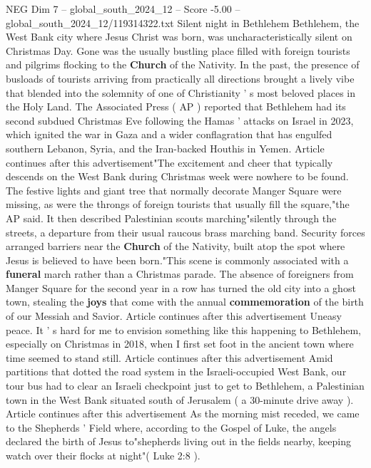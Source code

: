 \begin{textsample}{NEG Dim 7 – global\_south\_2024\_12 – Score -5.00 – global\_south\_2024\_12/119314322.txt}  \label{ex:f7_neg_296}
Silent night in Bethlehem Bethlehem, the West Bank city where Jesus Christ was born, was uncharacteristically silent on Christmas Day.
Gone was the usually bustling place filled with foreign tourists and pilgrims flocking to the \textbf{Church} of the Nativity.
In the past, the presence of busloads of tourists arriving from practically all directions brought a lively vibe that blended into the solemnity of one of Christianity ' s most beloved places in the Holy Land.
The Associated Press ( AP ) reported that Bethlehem had its second subdued Christmas Eve following the Hamas ' attacks on Israel in 2023, which ignited the war in Gaza and a wider conflagration that has engulfed southern Lebanon, Syria, and the Iran-backed Houthis in Yemen.
Article continues after this advertisement"The excitement and cheer that typically descends on the West Bank during Christmas week were nowhere to be found.
The festive lights and giant tree that normally decorate Manger Square were missing, as were the throngs of foreign tourists that usually fill the square,"the AP said.
It then described Palestinian scouts marching"silently through the streets, a departure from their usual raucous brass marching band.
Security forces arranged barriers near the \textbf{Church} of the Nativity, built atop the spot where Jesus is believed to have been born."This scene is commonly associated with a \textbf{funeral} march rather than a Christmas parade.
The absence of foreigners from Manger Square for the second year in a row has turned the old city into a ghost town, stealing the \textbf{joys} that come with the annual \textbf{commemoration} of the birth of our Messiah and Savior.
Article continues after this advertisement Uneasy peace.
It ' s hard for me to envision something like this happening to Bethlehem, especially on Christmas in 2018, when I first set foot in the ancient town where time seemed to stand still.
Article continues after this advertisement Amid partitions that dotted the road system in the Israeli-occupied West Bank, our tour bus had to clear an Israeli checkpoint just to get to Bethlehem, a Palestinian town in the West Bank situated south of Jerusalem ( a 30-minute drive away ).
Article continues after this advertisement As the morning mist receded, we came to the Shepherds ' Field where, according to the Gospel of Luke, the angels declared the birth of Jesus to"shepherds living out in the fields nearby, keeping watch over their flocks at night"( Luke 2:8 ).

\end{textsample}
